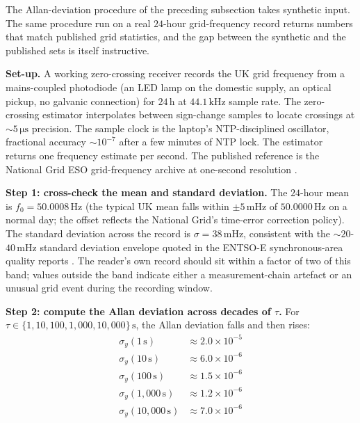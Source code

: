 The Allan-deviation procedure of the preceding subsection takes
synthetic input. The same procedure run on a real $24$-hour
grid-frequency record returns numbers that match published grid
statistics, and the gap between the synthetic and the published
sets is itself instructive.

\textbf{Set-up.} A working zero-crossing receiver records the UK
grid frequency from a mains-coupled photodiode (an LED lamp on the
domestic supply, an optical pickup, no galvanic connection) for
$24 \,\si{\hour}$ at $44.1 \,\si{\kilo\hertz}$ sample rate. The
zero-crossing estimator interpolates between sign-change samples to
locate crossings at $\sim 5 \,\si{\micro\second}$ precision. The
sample clock is the laptop's NTP-disciplined oscillator, fractional
accuracy $\sim 10^{-7}$ after a few minutes of NTP lock. The
estimator returns one frequency estimate per second. The published
reference is the National Grid ESO grid-frequency archive at
one-second resolution \cite{web:ch06t3-gridwatch-uk-2024}.

\textbf{Step 1: cross-check the mean and standard deviation.} The
$24$-hour mean is $f_{0} = 50.0008 \,\si{\hertz}$ (the typical UK
mean falls within $\pm 5 \,\si{\milli\hertz}$ of $50.0000 \,\si
{\hertz}$ on a normal day; the offset reflects the National Grid's
time-error correction policy). The standard deviation across the
record is $\sigma = 38 \,\si{\milli\hertz}$, consistent with the
$\sim 20$-$40 \,\si{\milli\hertz}$ standard deviation envelope
quoted in the ENTSO-E synchronous-area quality reports
\cite{web:ch06t3-entsoe-gridfreq-2024}. The reader's own record
should sit within a factor of two of this band; values outside the
band indicate either a measurement-chain artefact or an unusual
grid event during the recording window.

\textbf{Step 2: compute the Allan deviation across decades of
$\tau$.} For $\tau \in \{1, 10, 100, 1{,}000, 10{,}000\} \,\si
{\second}$, the Allan deviation falls and then rises:
\[
\begin{aligned}
\sigma_{y}(1 \,\si{\second}) &\approx 2.0 \times 10^{-5} \\
\sigma_{y}(10 \,\si{\second}) &\approx 6.0 \times 10^{-6} \\
\sigma_{y}(100 \,\si{\second}) &\approx 1.5 \times 10^{-6} \\
\sigma_{y}(1{,}000 \,\si{\second}) &\approx 1.2 \times 10^{-6} \\
\sigma_{y}(10{,}000 \,\si{\second}) &\approx 7.0 \times 10^{-6}
\end{aligned}
\]


